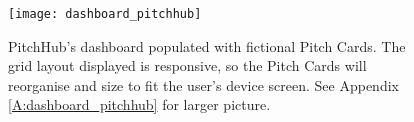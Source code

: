 \begin{figure}[ht]
    \centering
    \texttt{[image: dashboard\_pitchhub]}
    \caption{PitchHub's dashboard populated with fictional Pitch Cards. The grid layout displayed is responsive, so the Pitch Cards will reorganise and size to fit the user's device screen. See Appendix \ref{A:dashboard_pitchhub} for larger picture.}
    \label{fig:dashboard_pitchhub}
\end{figure}